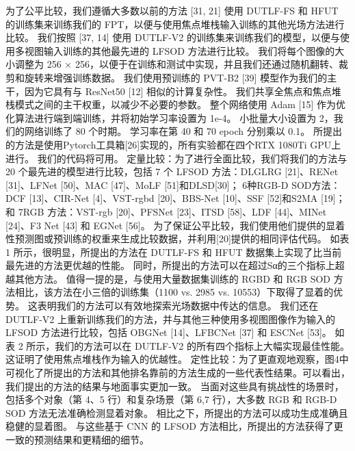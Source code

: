 为了公平比较，我们遵循大多数以前的方法 [31, 21] 使用 DUTLF-FS 和 HFUT 的训练集来训练我们的 FPT，以便与使用焦点堆栈输入训练的其他光场方法进行比较。 我们按照 [37, 14] 使用 DUTLF-V2 的训练集来训练我们的模型，以便与使用多视图输入训练的其他最先进的 LFSOD 方法进行比较。 我们将每个图像的大小调整为 256 × 256，以便于在训练和测试中实现，并且我们还通过随机翻转、裁剪和旋转来增强训练数据。
我们使用预训练的 PVT-B2 [39] 模型作为我们的主干，因为它具有与 ResNet50 [12] 相似的计算复杂性。 我们共享全焦点和焦点堆栈模式之间的主干权重，以减少不必要的参数。 整个网络使用 Adam [15] 作为优化算法进行端到端训练，并将初始学习率设置为 1e-4。 小批量大小设置为 2，我们的网络训练了 80 个时期。 学习率在第 40 和 70 epoch 分别乘以 0.1。 所提出的方法是使用Pytorch工具箱[26]实现的，所有实验都在四个RTX 1080Ti GPU上进行。 我们的代码将可用。 定量比较：为了进行全面比较，我们将我们的方法与 20 个最先进的模型进行比较，包括 7 个 LFSOD 方法：DLGLRG [21]、RENet [31]、LFNet [50]、MAC [47]、MoLF [51]和DLSD[30]； 6种RGB-D SOD方法：DCF [13]、CIR-Net [4]、VST-rgbd [20]、BBS-Net [10]、SSF [52]和S2MA [19]； 和 7RGB 方法：VST-rgb [20]、PFSNet [23]、ITSD [58]、LDF [44]、MINet [24]、F3 Net [43] 和 EGNet [56]。 为了保证公平比较，我们使用他们提供的显着性预测图或预训练的权重来生成比较数据，并利用[20]提供的相同评估代码。 如表 1 所示，很明显，所提出的方法在 DUTLF-FS 和 HFUT 数据集上实现了比当前最先进的方法更优越的性能。 同时，所提出的方法可以在超过Sα的三个指标上超越其他方法。 值得一提的是，与使用大量数据集训练的 RGBD 和 RGB SOD 方法相比，该方法在小三倍的训练集（1100 vs. 2985 vs. 10553）下取得了显着的优势。 这表明我们的方法可以有效地探索光场数据中传达的信息。 我们还在 DUTLF-V2 上重新训练我们的方法，并与其他三种使用多视图图像作为输入的 LFSOD 方法进行比较，包括 OBGNet [14]、LFBCNet [37] 和 ESCNet [53]。 如表 2 所示，我们的方法可以在 DUTLF-V2 的所有四个指标上大幅实现最佳性能。 这证明了使用焦点堆栈作为输入的优越性。 定性比较：为了更直观地观察，图4中可视化了所提出的方法和其他排名靠前的方法生成的一些代表性结果。可以看出，我们提出的方法的结果与地面事实更加一致。 当面对这些具有挑战性的场景时，包括多个对象（第 4、5 行）和复杂场景（第 6,7 行），大多数 RGB 和 RGB-D SOD 方法无法准确检测显着对象。 相比之下，所提出的方法可以成功生成准确且稳健的显着图。 与这些基于 CNN 的 LFSOD 方法相比，所提出的方法获得了更一致的预测结果和更精细的细节。




